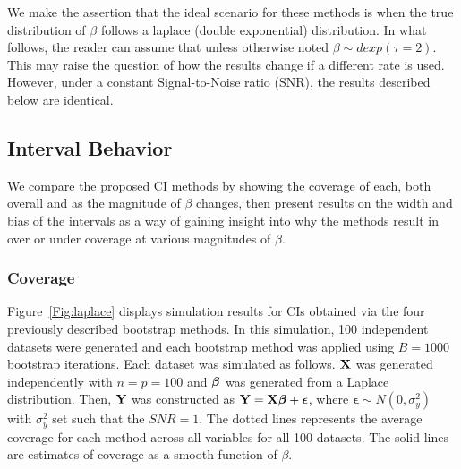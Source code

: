 We make the assertion that the ideal scenario for these methods is when the true distribution of $\beta$ follows a laplace (double exponential) distribution. In what follows, the reader can assume that unless otherwise noted $\beta \sim dexp(\tau = 2)$. This may raise the question of how the results change if a different rate is used. However, under a constant Signal-to-Noise ratio (SNR), the results described below are identical.  

\subsection{Interval Behavior}

We compare the proposed CI methods by showing the coverage of each, both overall and as the magnitude of $\beta$ changes, then present results on the width and bias of the intervals as a way of gaining insight into why the methods result in over or under coverage at various magnitudes of $\beta$.

\subsubsection{Coverage}\label{Sec:Coverage}


Figure~\ref{Fig:laplace} displays simulation results for CIs obtained via the four previously described bootstrap methods. In this simulation, 100 independent datasets were generated and each bootstrap method was applied using $B = 1000$ bootstrap iterations. Each dataset was simulated as follows. $\mathbf{X}$ was generated independently with $n = p = 100$ and $\boldsymbol{\beta}$ was generated from a Laplace distribution. Then, $\mathbf{Y}$ was constructed as $\mathbf{Y} = \mathbf{X}\boldsymbol{\beta} + \boldsymbol{\epsilon}$, where $\boldsymbol{\epsilon} \sim N(0, \sigma^2_y)$ with $\sigma^2_y$ set such that the $SNR = 1$. The dotted lines represents the average coverage for each method across all variables for all 100 datasets. The solid lines are estimates of coverage as a smooth function of $\beta$.

